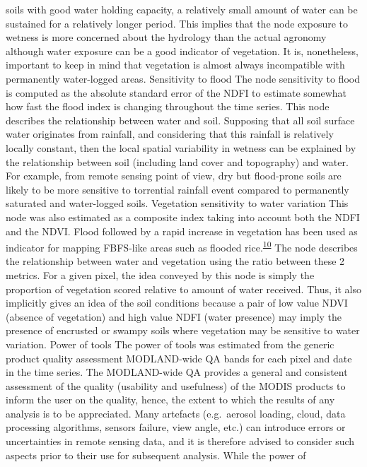 \documentclass[12pt,oneside]{article}
\begin{document}
soils with good water holding capacity, a relatively small amount of
water can be sustained for a relatively longer period. This implies that
the node exposure to wetness is more concerned about the hydrology than
the actual agronomy although water exposure can be a good indicator of
vegetation. It is, nonetheless, important to keep in mind that
vegetation is almost always incompatible with permanently water-logged
areas. Sensitivity to flood The node sensitivity to flood is computed as
the absolute standard error of the NDFI to estimate somewhat how fast
the flood index is changing throughout the time series. This node
describes the relationship between water and soil. Supposing that all
soil surface water originates from rainfall, and considering that this
rainfall is relatively locally constant, then the local spatial
variability in wetness can be explained by the relationship between soil
(including land cover and topography) and water. For example, from
remote sensing point of view, dry but flood-prone soils are likely to be
more sensitive to torrential rainfall event compared to permanently
saturated and water-logged soils. Vegetation sensitivity to water
variation This node was also estimated as a composite index taking into
account both the NDFI and the NDVI. Flood followed by a rapid increase
in vegetation has been used as indicator for mapping FBFS-like areas
such as flooded
rice.\textsuperscript{\protect\hyperlink{ref-Boschetti_et_al_2014}{10}}
The node describes the relationship between water and vegetation using
the ratio between these 2 metrics. For a given pixel, the idea conveyed
by this node is simply the proportion of vegetation scored relative to
amount of water received. Thus, it also implicitly gives an idea of the
soil conditions because a pair of low value NDVI (absence of vegetation)
and high value NDFI (water presence) may imply the presence of encrusted
or swampy soils where vegetation may be sensitive to water variation.
Power of tools The power of tools was estimated from the generic product
quality assessment MODLAND-wide QA bands for each pixel and date in the
time series. The MODLAND-wide QA provides a general and consistent
assessment of the quality (usability and usefulness) of the MODIS
products to inform the user on the quality, hence, the extent to which
the results of any analysis is to be appreciated. Many artefacts
(e.g.~aerosol loading, cloud, data processing algorithms, sensors
failure, view angle, etc.) can introduce errors or uncertainties in
remote sensing data, and it is therefore advised to consider such
aspects prior to their use for subsequent analysis. While the power of
\end{document}
